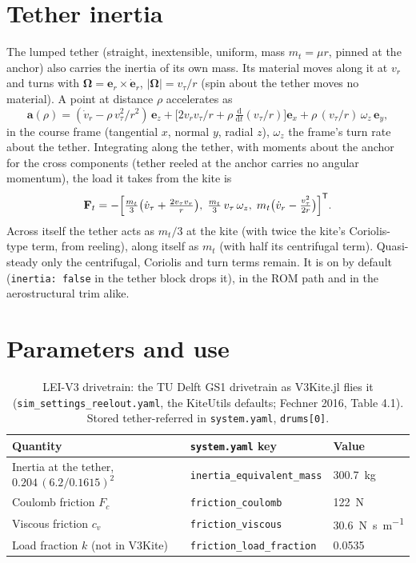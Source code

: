 \documentclass[11pt,a4paper]{article}
\newcommand{\code}[1]{\texttt{\small #1}}
\begin{document}
\section{Tether inertia}

The lumped tether (straight, inextensible, uniform, mass $m_t = \mu r$, pinned
at the anchor) also carries the inertia of its own mass. Its material moves
along it at $v_r$ and turns with $\boldsymbol\Omega = \mathbf e_r\times\dot{\mathbf e}_r$,
$|\boldsymbol\Omega| = v_\tau/r$ (spin about the tether moves no material). A
point at distance $\rho$ accelerates as
\begin{equation}
  \mathbf a(\rho) = (\dot v_r - \rho\, v_\tau^2/r^2)\,\mathbf e_z
  + \bigl[2 v_r v_\tau/r + \rho\,\tfrac{\mathrm d}{\mathrm dt}(v_\tau/r)\bigr]\mathbf e_x
  + \rho\,(v_\tau/r)\,\omega_z\,\mathbf e_y ,
\end{equation}
in the course frame (tangential $x$, normal $y$, radial $z$), $\omega_z$ the
frame's turn rate about the tether. Integrating along the tether, with moments
about the anchor for the cross components (tether reeled at the anchor carries
no angular momentum), the load it takes from the kite is
\begin{equation}
  \mathbf F_{t} = -\Bigl[\tfrac{m_t}{3}\bigl(\dot v_\tau + \tfrac{2 v_\tau v_r}{r}\bigr),\;
  \tfrac{m_t}{3}\, v_\tau\,\omega_z,\;
  m_t\bigl(\dot v_r - \tfrac{v_\tau^2}{2r}\bigr)\Bigr]^{\mathsf T} .
\end{equation}
Across itself the tether acts as $m_t/3$ at the kite (with twice the kite's
Coriolis-type term, from reeling), along itself as $m_t$ (with half its
centrifugal term). Quasi-steady only the centrifugal, Coriolis and turn terms
remain. It is on by default (\code{inertia: false} in the tether block drops
it), in the ROM path and in the aerostructural trim alike.

\section{Parameters and use}

\begin{table}[H]
\centering\small
\caption{LEI-V3 drivetrain: the TU Delft GS1 drivetrain as V3Kite.jl flies it
(\code{sim\_settings\_reelout.yaml}, the KiteUtils defaults; Fechner 2016,
Table 4.1). Stored tether-referred in \code{system.yaml}, \code{drums[0]}.}
\begin{tabular}{lll}
\toprule
Quantity & \code{system.yaml} key & Value \\
\midrule
Inertia at the tether, $0.204\,(6.2/0.1615)^2$ & \code{inertia\_equivalent\_mass} & \SI{300.7}{kg} \\
Coulomb friction $F_c$ & \code{friction\_coulomb} & \SI{122}{N} \\
Viscous friction $c_v$ & \code{friction\_viscous} & \SI{30.6}{N.s.m^{-1}} \\
Load fraction $k$ (not in V3Kite) & \code{friction\_load\_fraction} & 0.0535 \\
\bottomrule
\end{tabular}
\end{table}
\end{document}

